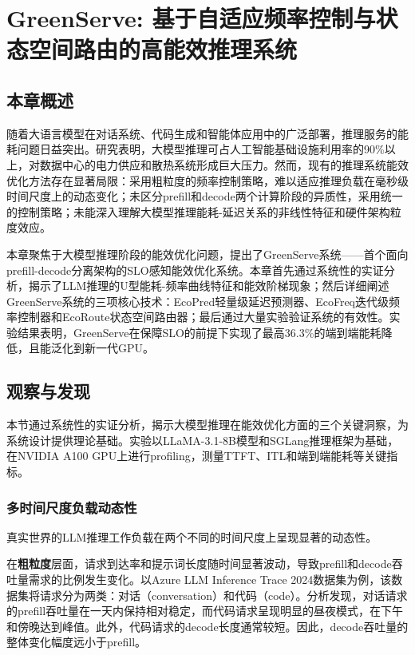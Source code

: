 
\chapter{GreenServe: 基于自适应频率控制与状态空间路由的高能效推理系统}

\section{本章概述}

随着大语言模型在对话系统、代码生成和智能体应用中的广泛部署，推理服务的能耗问题日益突出。研究表明，大模型推理可占人工智能基础设施利用率的90\%以上，对数据中心的电力供应和散热系统形成巨大压力。然而，现有的推理系统能效优化方法存在显著局限：采用粗粒度的频率控制策略，难以适应推理负载在毫秒级时间尺度上的动态变化；未区分prefill和decode两个计算阶段的异质性，采用统一的控制策略；未能深入理解大模型推理能耗-延迟关系的非线性特征和硬件架构粒度效应。

本章聚焦于大模型推理阶段的能效优化问题，提出了GreenServe系统——首个面向prefill-decode分离架构的SLO感知能效优化系统。本章首先通过系统性的实证分析，揭示了LLM推理的U型能耗-频率曲线特征和能效阶梯现象；然后详细阐述GreenServe系统的三项核心技术：EcoPred轻量级延迟预测器、EcoFreq迭代级频率控制器和EcoRoute状态空间路由器；最后通过大量实验验证系统的有效性。实验结果表明，GreenServe在保障SLO的前提下实现了最高36.3\%的端到端能耗降低，且能泛化到新一代GPU。

\section{观察与发现}

本节通过系统性的实证分析，揭示大模型推理在能效优化方面的三个关键洞察，为系统设计提供理论基础。实验以LLaMA-3.1-8B模型和SGLang推理框架为基础，在NVIDIA A100 GPU上进行profiling，测量TTFT、ITL和端到端能耗等关键指标。

\subsection{多时间尺度负载动态性}
\label{subsec:temporal-variation}

真实世界的LLM推理工作负载在两个不同的时间尺度上呈现显著的动态性。

在\textbf{粗粒度}层面，请求到达率和提示词长度随时间显著波动，导致prefill和decode吞吐量需求的比例发生变化。以Azure LLM Inference Trace 2024数据集为例，该数据集将请求分为两类：对话（conversation）和代码（code）。分析发现，对话请求的prefill吞吐量在一天内保持相对稳定，而代码请求呈现明显的昼夜模式，在下午和傍晚达到峰值。此外，代码请求的decode长度通常较短。因此，decode吞吐量的整体变化幅度远小于prefill。


